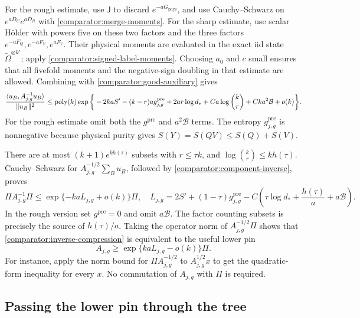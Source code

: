For the rough estimate, use $\mathsf J$ to discard
$e^{-aG_{\mathrm{phys}}}$, and use Cauchy--Schwarz on
$e^{aD_C}e^{aD_R}$ with \eqref{comparator:merge-moments}.
For the sharp estimate, use scalar Hölder with powers five on these two
factors and the three factors
$e^{-aF_Q},e^{-aF_V},e^{aF_Y}$.  Their physical moments are evaluated in
the exact iid state $\widetilde\Omega^{\otimes k'}$; apply
\eqref{comparator:signed-label-moments}.  Choosing $a_0$ and $c$ small
ensures that all fivefold moments and the negative-sign doubling in that
estimate are allowed.  Combining with
\eqref{comparator:good-auxiliary} gives
\begin{align}
 \frac{\langle u_B,A_{j,g}^{-1}u_B\rangle}{\|u_B\|^2}
 \le\operatorname{poly}(k)\exp\bigg\{
  -2kaS'-(k-r)a g_{j,g}^{\mathrm{pre}}
  +2ar\log d_*+Ca\log\binom{k}{r}
  +Cka^2\mathcal B+o(k)\bigg\}.
 \label{comparator:component-inverse}
\end{align}
For the rough estimate omit both the $g^{\mathrm{pre}}$ and
$a^2\mathcal B$ terms.  The entropy
$g_{j,g}^{\mathrm{pre}}$ is nonnegative because physical purity gives
$S(Y)=S(QV)\le S(Q)+S(V)$.

There are at most $(k+1)e^{kh(\tau)}$ subsets with $r\le\tau k$, and
$\log\binom{k}{r}\le kh(\tau)$.  Cauchy--Schwarz for
$A_{j,g}^{-1/2}\sum_Bu_B$, followed by
\eqref{comparator:component-inverse}, proves
\begin{equation}
 \Pi A_{j,g}^{-1}\Pi
       \le\exp\{-kaL_{j,g}+o(k)\}\Pi,
 \quad
 L_{j,g}=2S'+(1-\tau)g_{j,g}^{\mathrm{pre}}
          -C\left(\tau\log d_*+\frac{h(\tau)}a+a\mathcal B\right).
 \label{comparator:inverse-compression}
\end{equation}
In the rough version set $g^{\mathrm{pre}}=0$ and omit $a\mathcal B$.
The factor counting subsets is precisely the source of $h(\tau)/a$.
Taking the operator norm of $A_{j,g}^{-1/2}\Pi$ shows that
\eqref{comparator:inverse-compression} is equivalent to the useful lower
pin
\begin{equation}
 A_{j,g}\ge\exp\{kaL_{j,g}-o(k)\}\Pi.
 \label{comparator:lower-pin}
\end{equation}
For instance, apply the norm bound for $\Pi A_{j,g}^{-1/2}$ to
$A_{j,g}^{1/2}x$ to get the quadratic-form inequality for every $x$.
No commutation of $A_{j,g}$ with $\Pi$ is required.

\subsection{Passing the lower pin through the tree}

